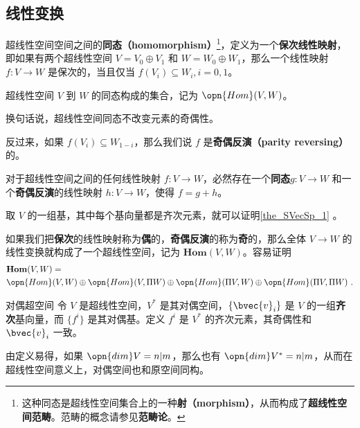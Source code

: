 \subsection{线性变换}

超线性空间空间之间的\textbf{同态（homomorphism）}\footnote{这种同态是超线性空间集合上的一种\textbf{射（morphism）}，从而构成了\textbf{超线性空间范畴}。范畴的概念请参见\textbf{范畴论}。}，定义为一个\textbf{保次线性映射}，即如果有两个超线性空间 $V=V_0\oplus V_1$ 和 $W=W_0\oplus W_1$，那么一个线性映射 $f:V\to W$ 是保次的，当且仅当 $f(V_i)\subseteq W_i, i=0, 1$。

\begin{definition}{}
超线性空间 $V$ 到 $W$ 的同态构成的集合，记为 $\opn{Hom}(V, W)$。
\end{definition}

换句话说，超线性空间同态不改变元素的奇偶性。

反过来，如果 $f(V_i)\subseteq W_{1-i}$，那么我们说 $f$ 是\textbf{奇偶反演（parity reversing）}的。

\begin{theorem}{}\label{the_SVecSp_1}
对于超线性空间之间的任何线性映射 $f:V\to W$，必然存在一个\textbf{同态}$g:V\to W$ 和一个\textbf{奇偶反演}的线性映射 $h:V\to W$，使得 $f=g+h$。
\end{theorem}

取 $V$ 的一组基，其中每个基向量都是齐次元素，就可以证明\autoref{the_SVecSp_1} 。

如果我们把\textbf{保次}的线性映射称为\textbf{偶}的，\textbf{奇偶反演}的称为\textbf{奇}的，那么全体 $V\to W$ 的线性变换就构成了一个超线性空间，记为 $\mathbf{Hom}(V, W)$。容易证明
\begin{equation}
\begin{aligned}
&\mathbf{Hom}(V, W)=\\&\opn{Hom}(V, W)\oplus\opn{Hom}(V, \Pi W)\oplus\opn{Hom}(\Pi V, W)\oplus\opn{Hom}(\Pi V, \Pi W)~.
\end{aligned}
\end{equation}

\begin{definition}{对偶超空间}
令 $V$ 是超线性空间，$V^*$ 是其对偶空间，$\{\bvec{v}_i\}$ 是 $V$ 的一组\textbf{齐次}基向量，而 $\{f^i\}$ 是其对偶基。定义 $f^i$ 是 $V^*$ 的齐次元素，其奇偶性和 $\bvec{v}_i$ 一致。
\end{definition}

由定义易得，如果 $\opn{dim}V=n|m$，那么也有 $\opn{dim}V^*=n|m$，从而在超线性空间意义上，对偶空间也和原空间同构。


